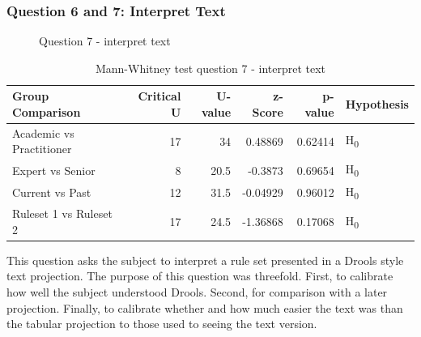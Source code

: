 \subsubsection{Question 6 and 7: Interpret Text}

\begin{figure}
    \centering
    \caption{Question 7 - interpret text}
    \label{fig:stackedbar_Q3}
\end{figure}

\begin{table}
    \begin{center}
        \begin{tabular}{ |l ||r |r |r | r|l | } 
            \hline
            Group Comparison                 & Critical U & U-value & z-Score  & p-value & Hypothesis         \\
            \hline
            \hline
            Academic vs Practitioner         & 17         & 34      &  0.48869 & 0.62414 & H\textsubscript{0} \\ 
            \hline
            Expert vs Senior                 & 8          & 20.5    &  -0.3873 & 0.69654 & H\textsubscript{0} \\ 
            \hline
            Current vs Past                  & 12         & 31.5    &  -0.04929& 0.96012 & H\textsubscript{0} \\ 
            \hline
            Ruleset 1 vs Ruleset 2           & 17         & 24.5    &  -1.36868& 0.17068 & H\textsubscript{0} \\ 
            \hline
        \end{tabular}
    \end{center}
    \caption{Mann-Whitney test question 7 - interpret text}
    \label{table:mannwhitneyQ3}
\end{table}

This question asks the subject to interpret a rule set presented in a Drools style text projection.
The purpose of this question was threefold.
First, to calibrate how well the subject understood Drools.
Second, for comparison with a later projection.
Finally, to calibrate whether and how much easier the text was than the tabular projection to those used to seeing the text version.

